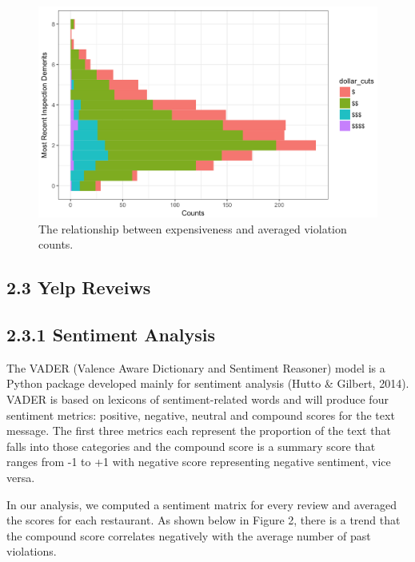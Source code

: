 \documentclass[letterpaper, 11 pt, conference]{ieeeconf}
\begin{document}
\begin{figure}[h]
	\centering
    \includegraphics[scale = 0.3]{expensive}
    \caption{The relationship between expensiveness and averaged violation counts. }
\end{figure}



\subsection*{2.3 Yelp Reveiws}

\subsection*{2.3.1 Sentiment Analysis}

The VADER (Valence Aware Dictionary and Sentiment Reasoner) model is a Python package developed mainly for sentiment analysis (Hutto \& Gilbert, 2014). VADER is based on lexicons of sentiment-related words and will produce four sentiment metrics: positive, negative, neutral and compound scores for the text message. The first three metrics each represent the proportion of the text that falls into those categories and the compound score is a summary score that ranges from -1 to +1 with negative score representing negative sentiment, vice versa.

In our analysis, we computed a sentiment matrix for every review and averaged the scores for each restaurant. As shown below in Figure 2, there is a trend that the compound score correlates negatively with the average number of past violations.
\end{document}
